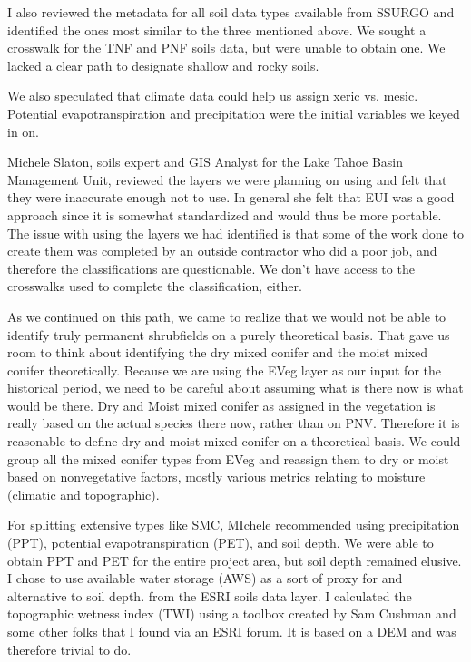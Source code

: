 I also reviewed the metadata for all soil data types available from SSURGO and identified the ones most similar to the three mentioned above. We sought a crosswalk for the TNF and PNF soils data, but were unable to obtain one. We lacked a clear path to designate shallow and rocky soils.

We also speculated that climate data could help us assign xeric vs. mesic. Potential evapotranspiration and precipitation were the initial variables we keyed in on.

Michele Slaton, soils expert and GIS Analyst for the Lake Tahoe Basin Management Unit, reviewed the layers we were planning on using and felt that they were inaccurate enough not to use. In general she felt that EUI was a good approach since it is somewhat standardized and would thus be more portable. The issue with using the layers we had identified is that some of the work done to create them was completed by an outside contractor who did a poor job, and therefore the classifications are questionable. We don't have access to the crosswalks used to complete the classification, either.

As we continued on this path, we came to realize that we would not be able to identify truly permanent shrubfields on a purely theoretical basis. That gave us room to think about identifying the dry mixed conifer and the moist mixed conifer theoretically. Because we are using the EVeg layer as our input for the historical period, we need to be careful about assuming what is there now is what would be there. Dry and Moist mixed conifer as assigned in the vegetation is really based on the actual species there now, rather than on PNV. Therefore it is reasonable to define dry and moist mixed conifer on a theoretical basis. We could group all the mixed conifer types from EVeg and reassign them to dry or moist based on nonvegetative factors, mostly various metrics relating to moisture (climatic and topographic). 

For splitting extensive types like SMC, MIchele recommended using precipitation (PPT), potential evapotranspiration (PET), and soil depth. We were able to obtain PPT and PET for the entire project area, but soil depth remained elusive. I chose to use available water storage (AWS) as a sort of proxy for and alternative to soil depth. from the ESRI soils data layer. I calculated the topographic wetness index (TWI) using a toolbox created by Sam Cushman and some other folks that I found via an ESRI forum. It is based on a DEM and was therefore trivial to do.

